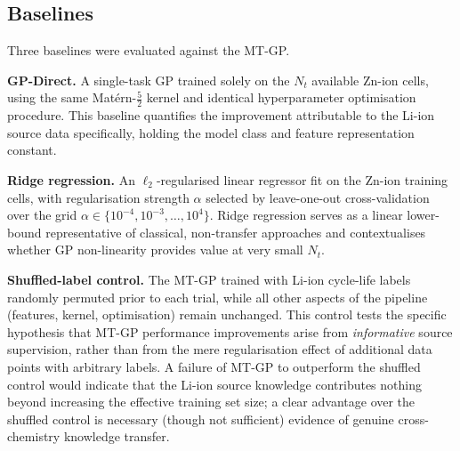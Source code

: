 \subsection{Baselines}
\label{sec:baselines}

Three baselines were evaluated against the MT-GP.

\textbf{GP-Direct.} A single-task GP trained solely on the $N_t$ available
Zn-ion cells, using the same Mat\'{e}rn-$\tfrac{5}{2}$ kernel and identical
hyperparameter optimisation procedure.  This baseline quantifies the
improvement attributable to the Li-ion source data specifically, holding
the model class and feature representation constant.

\textbf{Ridge regression.} An $\ell_2$-regularised linear regressor fit on
the Zn-ion training cells, with regularisation strength $\alpha$ selected
by leave-one-out cross-validation over the grid
$\alpha \in \{10^{-4}, 10^{-3}, \ldots, 10^{4}\}$.  Ridge regression serves
as a linear lower-bound representative of classical, non-transfer approaches
and contextualises whether GP non-linearity provides value at very small
$N_t$.

\textbf{Shuffled-label control.} The MT-GP trained with Li-ion cycle-life
labels randomly permuted prior to each trial, while all other aspects of
the pipeline (features, kernel, optimisation) remain unchanged.  This
control tests the specific hypothesis that MT-GP performance improvements
arise from \emph{informative} source supervision, rather than from the
mere regularisation effect of additional data points with arbitrary labels.
A failure of MT-GP to outperform the shuffled control would indicate that
the Li-ion source knowledge contributes nothing beyond increasing the
effective training set size; a clear advantage over the shuffled control is
necessary (though not sufficient) evidence of genuine cross-chemistry
knowledge transfer.
